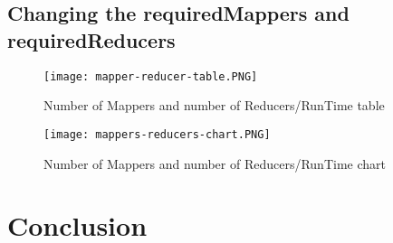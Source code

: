 \section{Changing the requiredMappers and requiredReducers}
\begin{figure}[H]
	\centering
	\texttt{[image: mapper-reducer-table.PNG]}
	\caption[Caption for LOF]{Number of Mappers and number of Reducers/RunTime table}
	\label{mapper-reducer-table}
\end{figure}
\begin{figure}[H]
	\centering
	\texttt{[image: mappers-reducers-chart.PNG]}
	\caption[Caption for LOF]{Number of Mappers and number of Reducers/RunTime chart}
	\label{mappers-reducers-chart}
\end{figure}
\chapter{Conclusion}
\label{conlusion}


